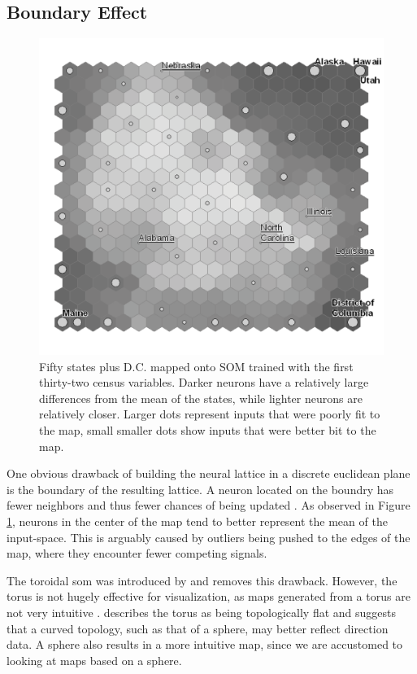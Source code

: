 \documentclass[11pt]{article}
\begin{document}
\subsection{Boundary Effect}
\begin{figure}
\centering
\includegraphics[width=1\linewidth]{gridedge_grey.pdf}
\caption{Fifty states plus D.C. mapped onto SOM trained with the first thirty-two census
variables.  Darker neurons have a relatively large differences from the mean of
the states, while lighter neurons are relatively closer.  Larger dots represent inputs
that were poorly fit to the map, small smaller dots show inputs that were better bit to the map.}
\label{figure1}
\end{figure}

One obvious drawback of building the neural lattice in a discrete euclidean 
plane is the boundary of the resulting lattice.  A neuron located on the boundry has 
fewer neighbors and thus fewer chances of being updated \citep{Wu:2006lr}.  
As observed in Figure \ref{figure1}, neurons in the center of the 
map tend to better represent the mean of the input-space.  This is arguably caused 
by outliers being pushed to the edges of the map, where they encounter fewer 
competing signals.

The toroidal som was introduced by \cite{li1993} and removes this drawback.
However, the torus is not hugely effective for visualization, as maps generated from 
a torus are not very intuitive \citep{ito2000,Wu:2006lr}.  \cite{ritter99} describes 
the torus as being topologically flat and suggests that a curved topology, such 
as that of a sphere, may better reflect direction data.  A sphere also results in a 
more intuitive map, since we are accustomed to looking at maps based on a sphere.
\end{document}
